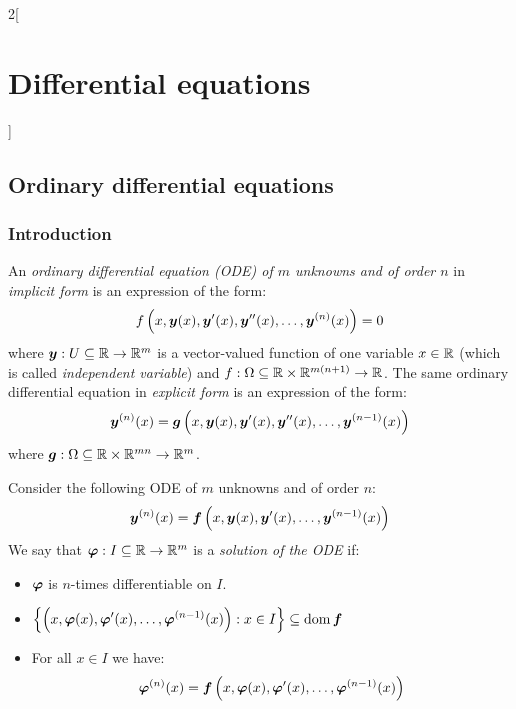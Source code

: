 \documentclass[../../../main.tex]{subfiles}
\begin{document}
\begin{multicols}{2}[\section{Differential equations}]
  \subsection{Ordinary differential equations}
  \subsubsection*{Introduction}
  \begin{definition}
    An \textit{ordinary differential equation (ODE) of $m$ unknowns and of order $n$} in \textit{implicit form} is an expression of the form: $$f\left(x,\boldsymbol{y}(x),\boldsymbol{y}'(x),\boldsymbol{y}''(x),\ldots,\boldsymbol{y}^{(n)}(x)\right)=0$$
    where $\boldsymbol{y}:U\subseteq\mathbb{R}\rightarrow\mathbb{R}^m$ is a vector-valued function of one variable $x\in\mathbb{R}$ (which is called \textit{independent variable}) and $f:\Omega\subseteq\mathbb{R}\times\mathbb{R}^{m(n+1)}\rightarrow\mathbb{R}$. The same ordinary differential equation in \textit{explicit form} is an expression of the form: $$\boldsymbol{y}^{(n)}(x)=\boldsymbol{g}\left(x,\boldsymbol{y}(x),\boldsymbol{y}'(x),\boldsymbol{y}''(x),\ldots,\boldsymbol{y}^{(n-1)}(x)\right)$$
    where $\boldsymbol{g}:\Omega\subseteq\mathbb{R}\times\mathbb{R}^{mn}\rightarrow\mathbb{R}^m$.
  \end{definition}
  \begin{definition}
    Consider the following ODE of $m$ unknowns and of order $n$: $$\boldsymbol{y}^{(n)}(x)=\boldsymbol{f}\left(x,\boldsymbol{y}(x),\boldsymbol{y}'(x),\ldots,\boldsymbol{y}^{(n-1)}(x)\right)$$
    We say that $\boldsymbol{\varphi}:I\subseteq\mathbb{R}\rightarrow\mathbb{R}^m$ is a \textit{solution of the ODE} if:
    \begin{itemize}
      \item $\boldsymbol{\varphi}$ is $n$-times differentiable on $I$.
      \item $\displaystyle\left\{\left(x,\boldsymbol{\varphi}(x),\boldsymbol{\varphi}'(x),\ldots,\boldsymbol{\varphi}^{(n-1)}(x)\right):x\in I\right\}\subseteq\operatorname{dom} \boldsymbol{f}$
      \item For all $x\in I$ we have:
            $$\boldsymbol{\varphi}^{(n)}(x)=\boldsymbol{f}\left(x,\boldsymbol{\varphi}(x),\boldsymbol{\varphi}'(x),\ldots,\boldsymbol{\varphi}^{(n-1)}(x)\right)$$

\end{itemize}
\end{definition}
\end{multicols}
\end{document}
